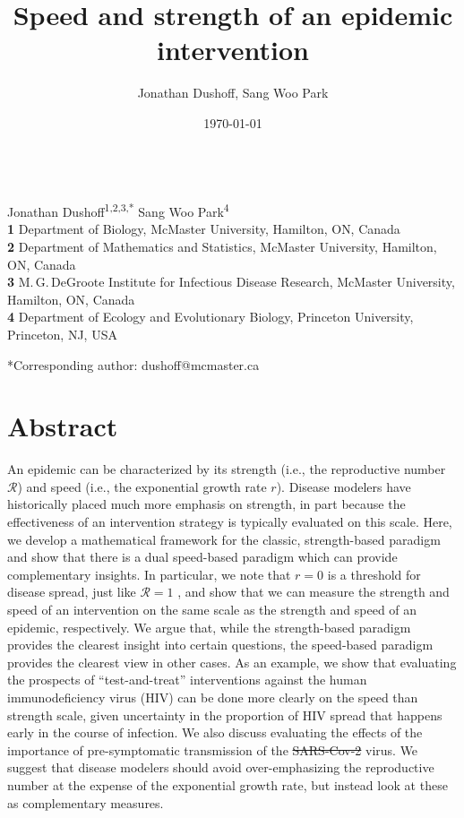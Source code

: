 \documentclass[12pt]{article}
\title{Speed and strength of an epidemic intervention}
\author{Jonathan Dushoff, Sang Woo Park}
\date{\today}
\newcommand{\RR}{\ensuremath{{\mathcal R}}}
\providecommand{\DIFaddtex}[1]{{\protect\color{blue}\uwave{#1}}} %
\providecommand{\DIFdeltex}[1]{{\protect\color{red}\sout{#1}}}                      %
\providecommand{\DIFaddbegin}{} %
\providecommand{\DIFaddend}{} %
\providecommand{\DIFdelbegin}{} %
\providecommand{\DIFdelend}{} %
\providecommand{\DIFadd}[1]{\texorpdfstring{\DIFaddtex{#1}}{#1}} %
\providecommand{\DIFdel}[1]{\texorpdfstring{\DIFdeltex{#1}}{}} %
\newcommand{\DIFscaledelfig}{0.5}
\newlength{\DIFdelgraphicswidth} %
\newlength{\DIFdelgraphicsheight} %
\newcommand{\DIFaddincludegraphics}[2][]{{\color{blue}\fbox{\DIFOincludegraphics[#1]{#2}}}} %
\newcommand{\DIFdelincludegraphics}[2][]{%
\sbox{\DIFdelgraphicsbox}{\DIFOincludegraphics[#1]{#2}}%
\settoboxwidth{\DIFdelgraphicswidth}{\DIFdelgraphicsbox} %
\settoboxtotalheight{\DIFdelgraphicsheight}{\DIFdelgraphicsbox} %
\scalebox{\DIFscaledelfig}{%
\parbox[b]{\DIFdelgraphicswidth}{\usebox{\DIFdelgraphicsbox}\\[-\baselineskip] \rule{\DIFdelgraphicswidth}{0em}}\llap{\resizebox{\DIFdelgraphicswidth}{\DIFdelgraphicsheight}{%
\setlength{\unitlength}{\DIFdelgraphicswidth}%
\begin{picture}(1,1)%
\thicklines\linethickness{2pt} %
{\color[rgb]{1,0,0}\put(0,0){\framebox(1,1){}}}%
{\color[rgb]{1,0,0}\put(0,0){\line( 1,1){1}}}%
{\color[rgb]{1,0,0}\put(0,1){\line(1,-1){1}}}%
\end{picture}%
}\hspace*{3pt}}} %
} %
\DeclareRobustCommand{\DIFaddbegin}{\DIFOaddbegin \let\includegraphics\DIFaddincludegraphics} %
\DeclareRobustCommand{\DIFaddend}{\DIFOaddend \let\includegraphics\DIFOincludegraphics} %
\DeclareRobustCommand{\DIFdelbegin}{\DIFOdelbegin \let\includegraphics\DIFdelincludegraphics} %
\DeclareRobustCommand{\DIFdelend}{\DIFOaddend \let\includegraphics\DIFOincludegraphics} %
\begin{document}
\begin{flushleft}{
	\Large
	\textbf{}
}
\newline
\\
Jonathan Dushoff\textsuperscript{1,2,3,*}
Sang Woo Park\textsuperscript{4}
\\
\bigskip
\textbf{1} Department of Biology, McMaster University, Hamilton, ON, Canada
\\
\textbf{2} Department of Mathematics and Statistics, McMaster University, Hamilton, ON, Canada
\\
\textbf{3} M.\,G.\,DeGroote Institute for Infectious Disease Research, McMaster University, Hamilton, ON, Canada
\\
\textbf{4} Department of Ecology and Evolutionary Biology, Princeton University, Princeton, NJ, USA
\\
\bigskip

*Corresponding author: dushoff@mcmaster.ca
\end{flushleft}

\section*{Abstract}

An epidemic can be characterized by its strength (i.e., the reproductive number \RR) and speed (i.e., the exponential growth rate $r$).
Disease modelers have historically placed much more emphasis on strength, in part because the effectiveness of an intervention strategy is typically evaluated on this scale.  
Here, we develop a mathematical framework for the classic, strength-based paradigm and show that there is a dual speed-based paradigm which can provide complementary insights.
In particular, we note that $r=0$ is a threshold for disease spread, just like $\RR=1$ \cite{dhmKermack}, and show that we can measure the strength and speed of an intervention on the same scale as the strength and speed of an epidemic, respectively.
We argue that, while the strength-based paradigm provides the clearest insight into certain questions, the speed-based paradigm provides the clearest view in other cases.
As an example, we show that evaluating the prospects of ``test-and-treat'' interventions against the human immunodeficiency virus (HIV) can be done more clearly on the speed than strength scale, given uncertainty in the proportion of HIV spread that happens early in the course of infection. 
We also discuss evaluating the effects of the importance of pre-symptomatic transmission of the \DIFdelbegin \DIFdel{SARS-Cov-2 }\DIFdelend \DIFaddbegin \DIFadd{SARS-CoV-2 }\DIFaddend virus.
We suggest that disease modelers should avoid over-emphasizing the reproductive number at the expense of the exponential growth rate, but instead look at these as complementary measures.
\end{document}
